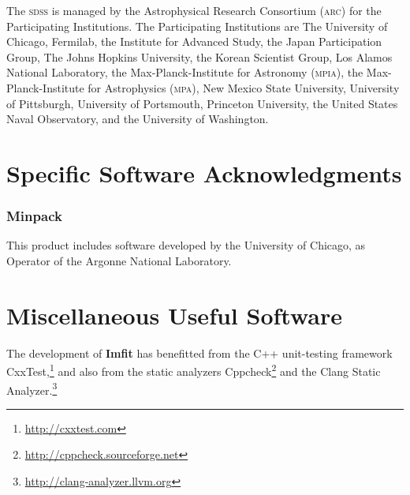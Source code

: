 \documentclass[10pt,a4paper,article]{memoir}
\newcommand{\imfit}{\textbf{Imfit}}
\begin{document}
The \textsc{sdss} is managed by the Astrophysical Research Consortium
(\textsc{arc}) for the Participating Institutions.  The Participating
Institutions are The University of Chicago, Fermilab, the Institute for
Advanced Study, the Japan Participation Group, The Johns Hopkins
University, the Korean Scientist Group, Los Alamos National Laboratory,
the Max-Planck-Institute for Astronomy (\textsc{mpia}), the
Max-Planck-Institute for Astrophysics (\textsc{mpa}), New Mexico State
University, University of Pittsburgh, University of Portsmouth,
Princeton University, the United States Naval Observatory, and the
University of Washington.



\section{Specific Software Acknowledgments}

\subsubsection{Minpack}
This product includes software developed by the University of Chicago, as Operator of
the Argonne National Laboratory.


\section{Miscellaneous Useful Software}

The development of \imfit{} has benefitted from the C++ unit-testing
framework CxxTest,\footnote{\url{http://cxxtest.com}} and also from the
static analyzers
Cppcheck\footnote{\url{http://cppcheck.sourceforge.net}} and the Clang
Static Analyzer.\footnote{\url{http://clang-analyzer.llvm.org}}




\end{document}

